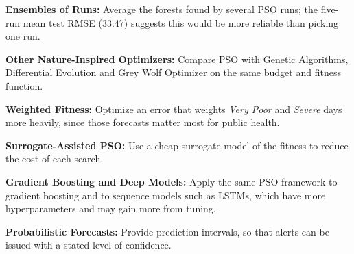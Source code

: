\textbf{Ensembles of Runs:} Average the forests found by several PSO runs; the five-run mean test RMSE (33.47) suggests this would be more reliable than picking one run.

\textbf{Other Nature-Inspired Optimizers:} Compare PSO with Genetic Algorithms, Differential Evolution and Grey Wolf Optimizer on the same budget and fitness function.

\textbf{Weighted Fitness:} Optimize an error that weights \emph{Very Poor} and \emph{Severe} days more heavily, since those forecasts matter most for public health.

\textbf{Surrogate-Assisted PSO:} Use a cheap surrogate model of the fitness to reduce the cost of each search.

\textbf{Gradient Boosting and Deep Models:} Apply the same PSO framework to gradient boosting and to sequence models such as LSTMs, which have more hyperparameters and may gain more from tuning.

\textbf{Probabilistic Forecasts:} Provide prediction intervals, so that alerts can be issued with a stated level of confidence.
